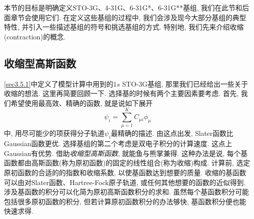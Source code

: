 本节的目标是明确定义STO-3G、4-31G、6-31G*、6-31G**基组, 
我们在此节和后面章节会使用它们. 
在定义这些基组的过程中, 
我们会涉及现今大部分基组的典型特性, 
并引入一些描述基组的符号和挑选基组的方式. 
特别地, 
我们先来介绍收缩(contraction)的概念. 

\subsection{收缩型高斯函数}
\autoref{sec3.5.1}中定义了模型计算中用到的$1s$ STO-3G基组, 那里我们已经给出一些关于收缩的想法. 
这里再简要回顾一下. 选择基的时候有两个主要因素要考虑.
首先, 我们希望使用最高效、精确的函数, 就是说如下展开
\begin{equation}
	\psi_i=\sum_{\mu=1}^{K}C_{\mu i}\phi_\mu
\end{equation}
中, 
用尽可能少的项获得分子轨道$\psi_i$最精确的描述. 
由这点出发, 
Slater函数比Gaussian函数更优. 
选择基组的第二个考虑是双电子积分的计算速度. 
这点上Gaussian有优势. 
借助\emph{收缩型高斯函数}, 
就能鱼与熊掌兼得. 
这种办法是说, 
每个基函数都由高斯函数(称为原初函数)的固定的线性组合(称为收缩)构成. 
计算前, 
选定原初函数的合适的的指数和收缩系数, 
以使基函数达到想要的质量. 
收缩的基函数可以由对Slater函数、Hartree-Fock原子轨道, 
或任何其他想要的函数的近似得到. 
涉及基函数的积分可以化简为原初高斯函数积分的求和. 
虽然每个基函数积分可能包括很多原初函数的积分, 
但若计算原初函数积分的办法够快, 
基函数积分便也能快速求得. 


